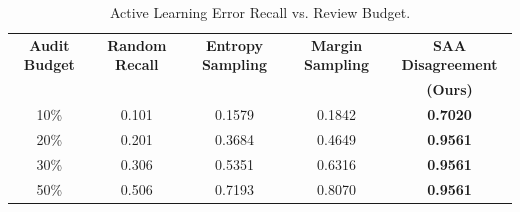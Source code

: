 \documentclass[11pt,a4paper]{article}
\begin{document}
\begin{table}[htbp]
\centering
\caption{Uncertainty Estimator Calibration Comparison. SAA (Ours) is bolded to highlight the proposed robust architecture; on human-verified validation data ($n=801$ expert scans), MC Dropout achieves comparable performance but collapses under domain-shift on real archival scans (see Section~\ref{sec:out_of_sample_awlf}). SAA and MC Dropout's identical recall of 0.9561 is coincidental, though Wilcoxon signed-rank tests show their underlying uncertainty distributions are statistically distinct.}
\label{tab:uncertainty_comp}
\end{table}

\begin{table}[htbp]
\centering
\caption{Active Learning Error Recall vs. Review Budget.}
\label{tab:active_learning_recall}
\begin{adjustbox}{max width=\linewidth}
\begin{tabular}{ccccc}
\toprule
\textbf{Audit Budget} & \textbf{Random Recall} & \textbf{Entropy Sampling} & \textbf{Margin Sampling} & \textbf{SAA Disagreement} \\
 & & & & \textbf{(Ours)} \\
\midrule
10\% & 0.101 & 0.1579 & 0.1842 & \textbf{0.7020} \\
20\% & 0.201 & 0.3684 & 0.4649 & \textbf{0.9561} \\
30\% & 0.306 & 0.5351 & 0.6316 & \textbf{0.9561} \\
50\% & 0.506 & 0.7193 & 0.8070 & \textbf{0.9561} \\
\bottomrule
\end{tabular}
\end{adjustbox}
\end{table}
\end{document}
